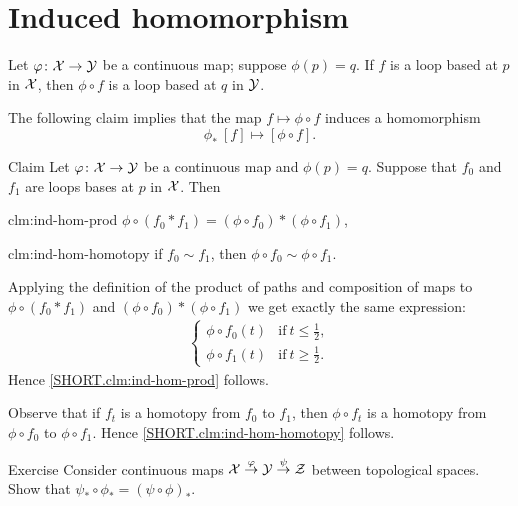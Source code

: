\section{Induced homomorphism}

Let $\varphi\colon\mathcal{X}\to \mathcal{Y}$ be a continuous map;
suppose $\phi(p)=q$.
If $f$ is a loop based at $p$ in $\mathcal{X}$, then $\phi\circ f$ is a loop based at $q$ in $\mathcal{Y}$.

The following claim implies that the map $f\mapsto\phi\circ f$ induces a homomorphism
\[\phi_*\:[f]\mapsto [\phi\circ f].\]

\begin{thm}{Claim}\label{clm:ind-hom}
Let $\varphi\colon\mathcal{X}\to \mathcal{Y}$ be a continuous map and $\phi(p)=q$.
Suppose that $f_0$ and $f_1$ are loops bases at $p$ in $\mathcal{X}$.
Then

\begin{subthm}{clm:ind-hom-prod}
$\phi\circ(f_0*f_1)=(\phi\circ f_0)*(\phi\circ f_1)$,
\end{subthm}

\begin{subthm}{clm:ind-hom-homotopy}
if $f_0\sim f_1$, then $\phi\circ f_0\sim\phi\circ f_1$.
\end{subthm}

\end{thm}

Applying the definition of the product of paths and composition of maps to $\phi\circ(f_0*f_1)$ and $(\phi\circ f_0)*(\phi\circ f_1)$ we get exactly the same expression:
\begin{align*}
\begin{cases}
\phi\circ f_0(t)&\text{if}\ t\le \tfrac12,
\\
\phi\circ f_1(t)&\text{if}\ t\ge \tfrac12.
\end{cases}
\end{align*}
Hence \ref{SHORT.clm:ind-hom-prod} follows.

Observe that if $f_t$ is a homotopy from $f_0$ to $f_1$, then $\phi\circ f_t$ is a homotopy from $\phi\circ f_0$ to $\phi\circ f_1$.
Hence \ref{SHORT.clm:ind-hom-homotopy} follows.
\qeds



\begin{thm}{Exercise}
Consider continuous maps 
$\mathcal{X}\stackrel{\varphi}{\to}\mathcal{Y}\stackrel{\psi}{\to}\mathcal{Z}$ between topological spaces.
Show that $\psi_*\circ\phi_*=(\psi\circ\phi)_*$.
\end{thm}

